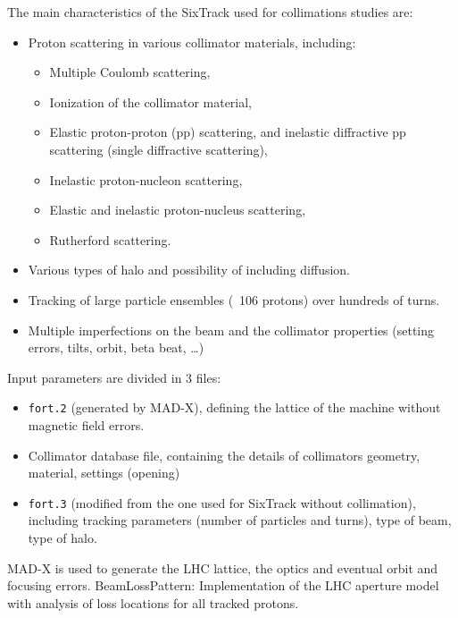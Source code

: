 \bigskip
\noindent The main characteristics of the SixTrack used for collimations studies are:
\begin{itemize}
    \item Proton scattering in various collimator materials, including:
    \begin{itemize}
        \item Multiple Coulomb scattering,
        \item Ionization of the collimator material,
        \item Elastic proton-proton (pp) scattering, and inelastic diffractive pp scattering (single diffractive scattering),
        \item Inelastic proton-nucleon scattering,
        \item Elastic and inelastic proton-nucleus scattering,
        \item Rutherford scattering.
    \end{itemize}
    \item Various types of halo and possibility of including diffusion.
    \item Tracking of large particle ensembles (~106 protons) over hundreds of turns.
    \item Multiple imperfections on the beam and the  collimator properties (setting errors, tilts, orbit, beta beat, …)
\end{itemize}

\bigskip
\noindent Input parameters are divided in 3 files:
\begin{itemize}
    \item \texttt{fort.2} (generated by MAD-X), defining the lattice of the machine without magnetic field errors.
    \item Collimator database file, containing the details of collimators geometry, material, settings (opening)
    \item \texttt{fort.3} (modified from the one used for SixTrack without collimation), including tracking parameters (number of particles and turns), type of beam, type of halo.
\end{itemize}

\noindent MAD-X is used to generate the LHC lattice, the optics and eventual orbit and focusing errors.
BeamLossPattern: Implementation of the LHC aperture model with analysis of loss locations for all tracked protons.

